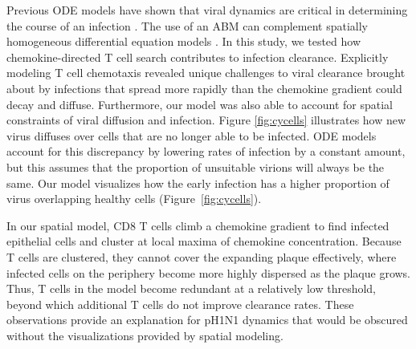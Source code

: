 \documentclass[preprint,10pt,authoryear]{elsarticle}
\begin{document}


Previous ODE models have shown that viral dynamics are critical in determining the course of an infection \citep{Handel2008, Lee2009, Miao2010a, Mitchell2011, Saenz2010, Crauste2015, Price2015}.  The use of an ABM can complement spatially homogeneous differential equation models \citep{Beltman2007, Textor2014, Vroomans2012, Zheng2008}.  In this study, we tested how chemokine-directed T cell search contributes to infection clearance.  Explicitly modeling T cell chemotaxis revealed unique challenges to viral clearance brought about by infections that spread more rapidly than the chemokine gradient could decay and diffuse.  Furthermore, our model was also able to account for spatial constraints of viral diffusion and infection.  Figure \ref{fig:cycells} illustrates how new virus diffuses over cells that are no longer able to be infected.  ODE models account for this discrepancy by lowering rates of infection by a constant amount, but this assumes that the proportion of unsuitable virions will always be the same.  Our model visualizes how the early infection has a higher proportion of virus overlapping healthy cells (Figure~\ref{fig:cycells}).  

In our spatial model, CD8 T cells climb a chemokine gradient to find infected epithelial cells and cluster at local maxima of chemokine concentration.  Because T cells are clustered, they cannot cover the expanding plaque effectively, where infected cells on the periphery become more highly dispersed as the plaque grows.  Thus, T cells in the model become redundant at a relatively low threshold, beyond which additional T cells do not improve clearance rates. These observations provide an explanation for pH1N1 dynamics that would be obscured without the visualizations provided by spatial modeling.  %
\end{document}
